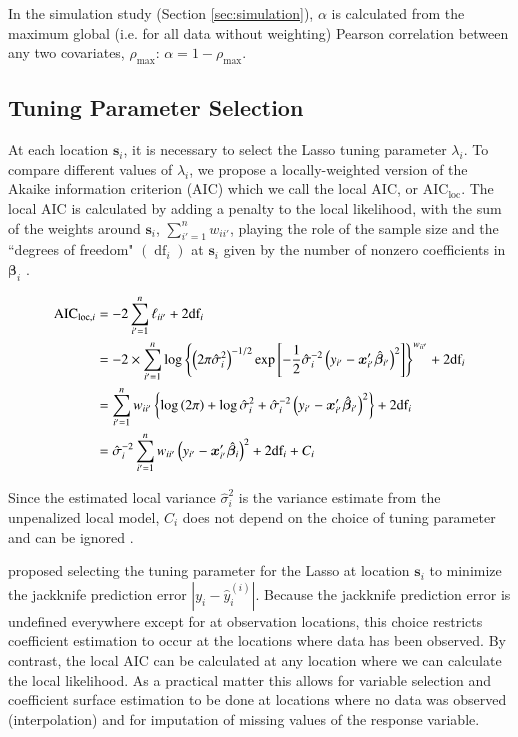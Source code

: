 \documentclass[authoryear, review, 11pt]{elsarticle}
\DeclareMathOperator*{\df}{\mbox{df}}
\begin{document}
	In the simulation study (Section \ref{sec:simulation}), $\alpha$ is calculated from the maximum global (i.e. for all data without weighting) Pearson correlation between any two covariates, $\rho_{\text{max}}$: $\alpha = 1-\rho_{\text{max}}$.

	\subsection{Tuning Parameter Selection}	
	At each location $\bm{s}_i$, it is necessary to select the Lasso tuning parameter $\lambda_i$. To compare different values of $\lambda_i$, we propose a locally-weighted version of the Akaike information criterion (AIC) \citep{Akaike:1974} which we call the local AIC, or $\mbox{AIC}_{\text{loc}}$. The local AIC is calculated by adding a penalty to the local likelihood, with the sum of the weights around $\bm{s}_i$, $\sum_{i'=1}^n w_{ii'}$, playing the role of the sample size and the ``degrees of freedom" $\left( \df_i \right)$ at $\bm{s}_i$ given by the number of nonzero coefficients in $\bm{\beta}_i$ \citep{Zou:2007}.
	
	\begin{align}
		\mbox{AIC}_{\text{loc}, i} &= -2 \sum_{i'=1}^n \ell_{ii'}  + 2 \mbox{df}_i\notag\\
		&= -2 \times \sum_{i'=1}^n \log \left\{ \left(2 \pi \hat{\sigma}_i^2\right)^{-1/2} \exp \left[-\frac{1}{2} \hat{\sigma}_i^{-2} \left(y_{i'} - \bm{x}_{i'}' \hat{\bm{\beta}}_{i'} \right)^2\right] \right\}^{w_{ii'}} + 2\mbox{df}_i\notag\\
		&= \sum_{i'=1}^n w_{ii'} \left\{ \log \left(2 \pi \right) + \log \hat{\sigma}_i^2 + \hat{\sigma}_i^{-2} \left(y_{i'} - \bm{x}_{i'}' \hat{\bm{\beta}}_{i'} \right)^2 \right\} + 2\mbox{df}_i \notag\\
		&= \hat{\sigma}_i^{-2} \sum_{i'=1}^n w_{ii'} \left( y_{i'} - \bm{x}'_{i'} \hat{\bm{\beta}}_i \right)^2 + 2 \mbox{df}_i + C_i
	\end{align}	
	
	Since the estimated local variance $\hat{\sigma}_i^2$ is the variance estimate from the unpenalized local model, $C_i$ does not depend on the choice of tuning parameter and can be ignored \citep{Zou:2007}.
	
	\cite{Wheeler:2009} proposed selecting the tuning parameter for the Lasso at location $\bm{s}_i$ to minimize the jackknife prediction error $|y_i - \hat{y}_i^{(i)}|$. Because the jackknife prediction error is undefined everywhere except for at observation locations, this choice restricts coefficient estimation to occur at the locations where data has been observed. By contrast, the local AIC can be calculated at any location where we can calculate the local likelihood. As a practical matter this allows for variable selection and coefficient surface estimation to be done at locations where no data was observed (interpolation) and for imputation of missing values of the response variable.
	 
\end{document}
